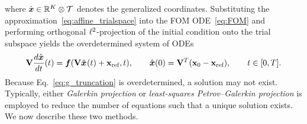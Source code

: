 \documentclass[3p,computermodern,10pt]{elsarticle}
\begin{document}
where $\hat{ \boldsymbol x} \in \mathbb{R}^{K} \otimes \mathcal{T}$ denotes the generalized
coordinates. Substituting the approximation~\eqref{eq:affine_trialspace} into the FOM ODE~\eqref{eq:FOM} and performing orthogonal
$\ell^2$-projection of the initial condition onto the trial subspace yields
the overdetermined system of ODEs
\begin{equation}\label{eq:g_truncation}
\mathbf {V} \frac{d \hat{ \boldsymbol x}} {dt}(t)= \boldsymbol f(\mathbf {V}
\hat{ \boldsymbol x}^{}(t) + \mathbf{x}_\text{ref},t ), \qquad \hat{ \boldsymbol x}(0) = \mathbf {V}^T( {{\mathbf{x}}_0} - \mathbf{x}_\text{ref}), \qquad t \in [0,T].
\end{equation}
Because Eq.~\eqref{eq:g_truncation} is overdetermined, a solution may not
exist. Typically, either \textit{Galerkin projection} or \textit{least-squares
Petrov--Galerkin projection} is employed to reduce the number of equations
such that a unique solution exists. We now describe these two methods.
\end{document}
